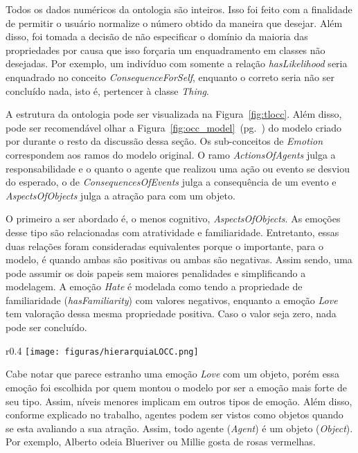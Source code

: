 Todos os dados numéricos da ontologia são inteiros. Isso foi feito com a
finalidade de permitir o usuário normalize\dev{} o número obtido da
maneira que desejar. Além disso, foi tomada a decisão de não especificar o
domínio da maioria das propriedades por causa que isso forçaria um
enquadramento em classes não desejadas. Por exemplo, um indivíduo
com somente a relação \emph{hasLikelihood} seria enquadrado no conceito
\emph{ConsequenceForSelf}, enquanto o correto seria não ser concluído nada,
isto é, pertencer à classe \emph{Thing}.

A estrutura da ontologia pode ser visualizada na Figura~\ref{fig:tlocc}. Além
disso, pode ser recomendável olhar a
Figura~\ref{fig:occ_model}~(pg.~\pageref{fig:occ_model}) do modelo criado por
\citet{ortony1988cse} durante o resto da discussão dessa seção. Os
sub-conceitos de \emph{Emotion} correspondem aos ramos do modelo original.
O ramo \emph{ActionsOfAgents} julga a responsabilidade e o quanto o agente que
realizou uma ação ou evento se desviou do esperado, o de
\emph{ConsequencesOfEvents} julga a consequência de um evento e
\emph{AspectsOfObjects} julga a atração para com um objeto.

O primeiro a ser abordado é, o menos cognitivo, \emph{AspectsOfObjects}.
As emoções desse tipo são relacionadas com atratividade e familiaridade.
Entretanto, essas duas relações foram consideradas equivalentes porque o
importante, para o modelo, é quando ambas são positivas ou ambas são
negativas. Assim sendo, uma pode assumir os dois papeis sem maiores
penalidades e simplificando a modelagem. A emoção \emph{Hate} é modelada como
tendo a propriedade de familiaridade (\emph{hasFamiliarity}) com valores
negativos, enquanto a emoção \emph{Love} tem valoração dessa mesma propriedade
positiva. Caso o valor seja zero, nada pode ser concluído.

\begin{wrapfigure}{r}{0.4\textwidth}
  \texttt{[image: figuras/hierarquiaLOCC.png]}
  \caption{Taxonomia da ontologia proposta baseado no modelo.}
  \label{fig:tlocc}
\end{wrapfigure}

Cabe notar que parece estranho uma emoção \emph{Love} com um objeto, porém
essa emoção foi escolhida por quem montou o modelo por ser a emoção mais forte
de seu tipo. Assim, níveis menores implicam em outros tipos de emoção. Além
disso, conforme explicado no trabalho, agentes podem ser vistos como objetos
quando se esta avaliando a sua atração. Assim, todo agente (\emph{Agent}) é um
objeto (\emph{Object}). Por exemplo, Alberto odeia Blueriver ou
Millie gosta de rosas vermelhas.

